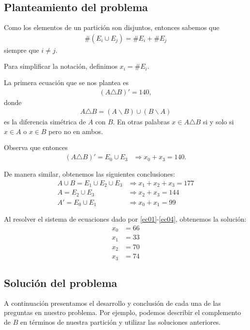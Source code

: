 \subsection{Planteamiento del problema}

Como los elementos de un partición son disjuntos, entonces sabemos que 
\begin{align*}
	\#\left(E_i\cup E_j\right) = \#E_i+\#E_j
\end{align*}
siempre que $ i\neq j $.

Para simplificar la notación, definimos $ x_i=\# E_i. $

La primera ecuación que se nos plantea es
\begin{align*}
	\left(A \triangle B \right)'=140,
\end{align*}
donde 
\begin{align*}
	A\triangle B = (A\backslash B)\cup(B\backslash A)
\end{align*}
es la diferencia simétrica de $ A $ con $ B $. En otras palabras $ x\in A \triangle B $ si y solo si $ x\in A $ o $ x \in B $ pero no en ambos.

Observa que entonces
\begin{align}
	\label{ec01}
	\left(A\triangle B\right)' = E_0 \cup E_3 &
	\Rightarrow
	x_0 + x_3 = 140.
\end{align}

De manera similar, obtenemos las siguientes conclusiones:
\begin{align}
	\label{ec02}
	A\cup B = E_1\cup E_2 \cup E_3 &
	\Rightarrow x_1+x_2+x_3=177 \\
	\label{ec03}
	A = E_2 \cup E_3 &
	\Rightarrow x_2+x_3 = 144 \\
	\label{ec04}
	A' = E_0 \cup E_1 &
	\Rightarrow x_0+x_1 =99
\end{align}

Al resolver el sistema de ecuaciones dado por  \ref{ec01}-\ref{ec04}, obtenemos la solución:
\begin{align*}
	x_0 &= 66 \\
	x_1 &= 33 \\
	x_2 &= 70 \\
	x_3 &= 74
\end{align*}

\subsection{Solución del problema}

A continuación presentamos el desarrollo y conclusión de cada una de las preguntas en nuestro problema. Por ejemplo, podemos describir el complemento de $ B $ en términos de nuestra partición y utilizar las soluciones anteriores. 


